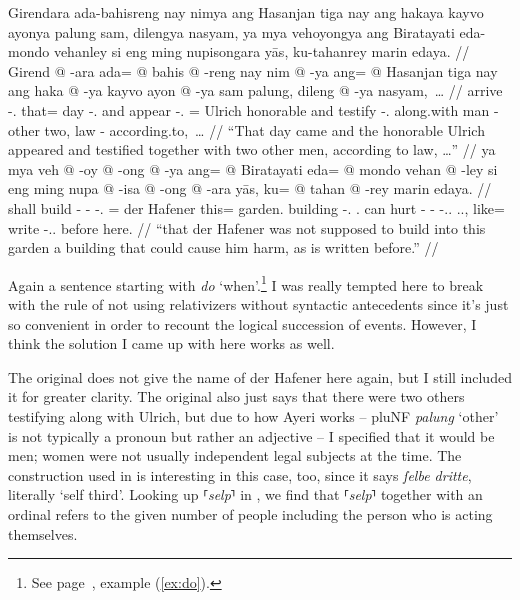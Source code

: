 \documentclass[12pt,paper=a4]{scrartcl}
\newcommand{\fw}[1]{\textit{#1}} %
\newcommand{\norm}[1]{⸢\textit{#1}⸣} %
\newcommand{\xayr}[3]{{\Tagati #1} \emph{#2} \enquote*{#3}}
\begin{document}
\pex
	\glpreamble Girendara ada-bahisreng nay nimya ang Hasanjan tiga nay ang 
		hakaya kayvo ayonya palung sam, dilengya nasyam, ya mya 
		vehoyongya ang Biratayati eda-mondo vehanley si eng ming 
		nupisongara yās, ku-tahanrey marin edaya. //
	\a \begingl
		\gla Girend @ -ara ada= @ bahis @ -reng nay nim @ -ya ang= @ 
			Hasanjan tiga nay ang haka @ -ya kayvo ayon @ -ya sam 
			palung, dileng @ -ya nasyam,~… //
		\glb arrive -\Tsg{}.\Inan{} that= day -\Aarg{}.\Inan{} and 
			appear -\Tsg{}.\M{} \Aarg{}= Ulrich honorable and 
			\AgtT{} testify -\Tsg{}.\M{} along.with man -\Loc{} 
			other two, law -\Loc{} according.to,~… //
		\glft \enquote{That day came and the honorable Ulrich appeared 
			and testified together with two other men, according to 
			law, …} //
	\endgl
	\a \begingl
		\gla ya mya veh @ -oy @ -ong @ -ya ang= @ Biratayati eda= @ mondo 
			vehan @ -ley si eng ming nupa @ -isa @ -ong @ -ara yās, 
			ku= @ tahan @ -rey marin edaya. //
		\glb \LocT{} shall build -\Neg{} -\Irr{} -\Tsg{}.\M{} \Aarg{}= 
			{der Hafener} this= garden.\Top{} building 
			-\Parg{}.\Inan{} \Rel{} \AgtT{}.\Inan{} can hurt 
			-\Caus{} -\Irr{} -\Tsg{}.\Inan{}.\Top{} 
			\Tsg{}.\M{}.\Parg{}, like= write -\Tsg{}.\Inan{}.\Parg{} 
			before here. //
		\glft \enquote{that {der Hafener} was not supposed to build into 
			this garden a building that could cause him harm, as is 
			written before.} //
	\endgl
\xe

Again a sentence starting with \fw{do} `when'.\footnote{See page~\pageref{ex:do},
example (\ref{ex:do}).} I was really tempted here to break with the rule of not 
using relativizers without syntactic antecedents since it's just so convenient 
in order to recount the logical succession of events. However, I think the 
solution I came up with here works as well.

The \Mhg{} original does not give the name of der Hafener here again, but I 
still included it for greater clarity. The original also just says that there 
were two others testifying along with Ulrich, but due to how Ayeri works -- 
\xayr{pluNF}{palung}{other} is not typically a pronoun but rather an adjective
-- I specified that it would be men; women were not usually independent legal 
subjects at the time. The construction used in \Mhg{} is interesting in this 
case, too, since it says \fw{ſelbe dritte}, literally `self third'. Looking up 
\norm{selp} in \citeauthor{lexer}, we find that \norm{selp} together with an 
ordinal refers to the given number of people including the person who is acting 
themselves.
\end{document}
